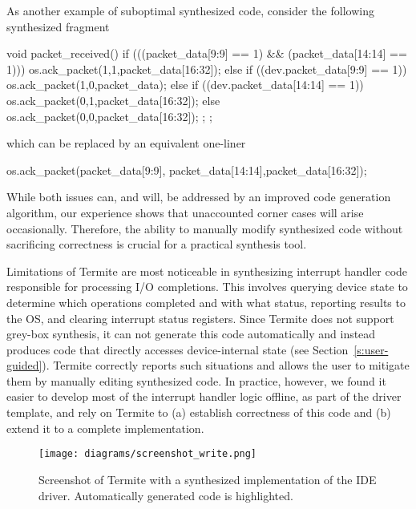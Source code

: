 \documentclass{book}
\newcommand{\termite}{Termite\xspace}
\theoremstyle{definition}
\begin{document}
As another example of suboptimal synthesized code, consider the following synthesized fragment

\begin{tsllisting}[frame=single]
void packet_received() {
  if (((packet_data[9:9] == 1) && 
       (packet_data[14:14] == 1))) {
    os.ack_packet(1,1,packet_data[16:32]);
  } else if ((dev.packet_data[9:9] == 1)) {
    os.ack_packet(1,0,packet_data);
  } else if ((dev.packet_data[14:14] == 1)) {
    os.ack_packet(0,1,packet_data[16:32]);
  } else {
    os.ack_packet(0,0,packet_data[16:32]);
  };
};
\end{tsllisting}

which can be replaced by an equivalent one-liner

\begin{tsllisting}[frame=single]
os.ack_packet(packet_data[9:9],
    packet_data[14:14],packet_data[16:32]);
\end{tsllisting}

\noindent While both issues can, and will, be addressed by an improved code generation algorithm, our experience shows that unaccounted corner cases will arise occasionally.  Therefore, the ability to manually modify synthesized code without sacrificing correctness is crucial for a practical synthesis tool.

Limitations of \termite are most noticeable in synthesizing interrupt handler code responsible for processing I/O completions.  This involves querying device state to determine which operations completed and with what status, reporting results to the OS, and clearing interrupt status registers.  Since \termite does not support grey-box synthesis, it can not generate this code automatically and instead produces code that directly accesses device-internal state (see Section~\ref{s:user-guided}).  \termite correctly reports such situations and allows the user to mitigate them by manually editing synthesized code.  In practice, however, we found it easier to develop most of the interrupt handler logic offline, as part of the driver template, and rely on \termite to (a) establish correctness of this code and (b) extend it to a complete implementation.

\begin{figure}
    \center
    \texttt{[image: diagrams/screenshot\_write.png]}
    \caption{Screenshot of \termite with a synthesized implementation of the IDE driver.  Automatically generated code is highlighted.}
    \label{f:screenshot_write}
\end{figure}
\end{document}
